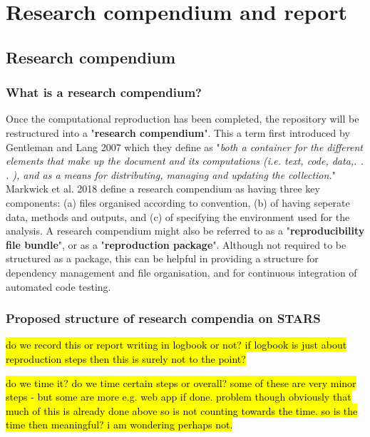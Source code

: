 \section{Research compendium and report}

\subsection{Research compendium}

\subsubsection{What is a research compendium?}

Once the computational reproduction has been completed, the repository will be restructured into a "\textbf{research compendium}". This a term first introduced by Gentleman and Lang 2007\autocite{gentleman_statistical_2007} which they define as "\textit{both a container for the different elements that make up the document and its computations (i.e. text, code, data,. . . ), and as a means for distributing, managing and updating the collection.}"\autocite{gentleman_statistical_2007} Markwick et al. 2018 define a research compendium as having three key components: (a) files organised according to convention, (b) of having seperate data, methods and outputs, and (c) of specifying the environment used for the analysis.\autocite{marwick_packaging_2018} A research compendium might also be referred to as a "\textbf{reproducibility file bundle}",\autocite{arguillas_10_2022} or as a "\textbf{reproduction package}".\autocite{krafczyk_learning_2021} Although not required to be structured as a package, this can be helpful in providing a structure for dependency management and file organisation, and for continuous integration of automated code testing.\autocite{marwick_packaging_2018}

\subsubsection{Proposed structure of research compendia on STARS}
\logno

\hl{do we record this or report writing in logbook or not? if logbook is just about reproduction steps then this is surely not to the point?}

\hl{do we time it? do we time certain steps or overall? some of these are very minor steps - but some are more e.g. web app if done. problem though obviously that much of this is already done above so is not counting towards the time. so is the time then meaningful? i am wondering perhaps not.}

